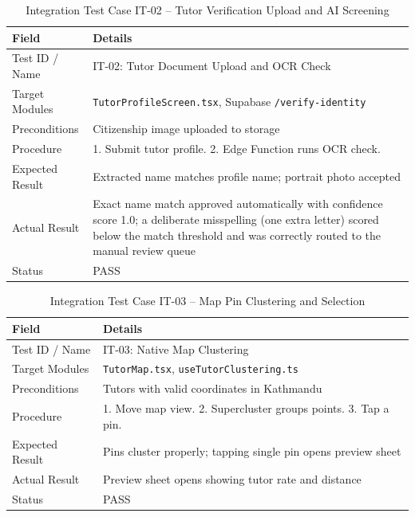 \documentclass[12pt]{report}
\begin{document}
\begin{table}[H]
\centering
\caption{Integration Test Case IT-02 -- Tutor Verification Upload and AI Screening}
\label{tab:it02}
\small
\begin{tabular}{|p{3.2cm}|p{11.5cm}|}
\hline
\textbf{Field} & \textbf{Details} \\
\hline
Test ID / Name & IT-02: Tutor Document Upload and OCR Check \\
\hline
Target Modules & \texttt{TutorProfileScreen.tsx}, Supabase \texttt{/verify-identity} \\
\hline
Preconditions & Citizenship image uploaded to storage \\
\hline
Procedure & 1. Submit tutor profile. 2. Edge Function runs OCR check. \\
\hline
Expected Result & Extracted name matches profile name; portrait photo accepted \\
\hline
Actual Result & Exact name match approved automatically with confidence score 1.0; a deliberate misspelling (one extra letter) scored below the match threshold and was correctly routed to the manual review queue \\
\hline
Status & PASS \\
\hline
\end{tabular}
\end{table}

\begin{table}[H]
\centering
\caption{Integration Test Case IT-03 -- Map Pin Clustering and Selection}
\label{tab:it03}
\small
\begin{tabular}{|p{3.2cm}|p{11.5cm}|}
\hline
\textbf{Field} & \textbf{Details} \\
\hline
Test ID / Name & IT-03: Native Map Clustering \\
\hline
Target Modules & \texttt{TutorMap.tsx}, \texttt{useTutorClustering.ts} \\
\hline
Preconditions & Tutors with valid coordinates in Kathmandu \\
\hline
Procedure & 1. Move map view. 2. Supercluster groups points. 3. Tap a pin. \\
\hline
Expected Result & Pins cluster properly; tapping single pin opens preview sheet \\
\hline
Actual Result & Preview sheet opens showing tutor rate and distance \\
\hline
Status & PASS \\
\hline
\end{tabular}
\end{table}
\end{document}
